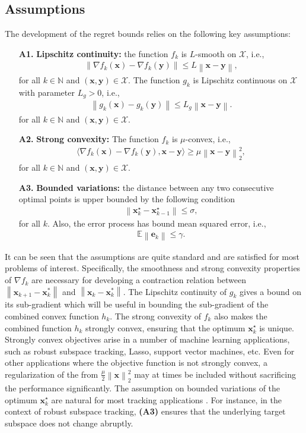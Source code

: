 \documentclass[draftcls,onecolumn,12pt]{IEEEtran}
\theoremstyle{plain}
\def\x{\mathbf{x}}
\def\e{\mathbf{e}}
\def\y{\mathbf{y}}
\def\cX {\mathcal{X}}
\def\N{\mathbb{N}}
\def\xks{\x_k^\star}
\def\EE{\mathbb{E}}
\providecommand{\norm}[1]{\left\|#1\right\|}
\providecommand{\ip}[1]{\langle#1\rangle}
\theoremstyle{plain}
\theoremstyle{remark}
\begin{document}
\subsection{Assumptions}
The development of the regret bounds relies on the following key assumptions: 
	  \begin{itemize}
	  	\item[\textbf{A1.}] \textbf{Lipschitz continuity:} the function $f_k$ is $L$-smooth on $\cX$, i.e., 
	  	\begin{align}\label{Lip_f1}
	  	\norm{\nabla f_k(\x) - \nabla f_k(\y)}\leq L\norm{\x-\y} , 
	  	\end{align}
	  	for all $k\in\N$ and $(\x,\y)\in\cX$. The function $g_k$ is Lipschitz continuous on $\cX$  with parameter $L_g>0$, i.e., 
        	\begin{align}\label{Lip_g1}
        \norm{ g_k(\x) -  g_k(\y)}\leq L_g\norm{\x-\y}.  
        \end{align}
        for all $k\in\N$ and $(\x,\y)\in\cX$. 
	  	\item[\textbf{A2.}] \textbf{Strong convexity:}  The function $f_k$ is $\mu$-convex, i.e.,
	  		  	\begin{align}\label{eq:SC}
	  	    \ip{\nabla f_k(\x) - \nabla f_k(\y),\x-\y} \geq \mu \norm{\x-\y}^2_2  , 
	  	\end{align}
for all $k\in\N$ and $(\x,\y)\in\cX$.			
	 \item[\textbf{A3.}] \textbf{Bounded variations:}  the distance between any two consecutive optimal points is upper bounded by the following condition 
	 \begin{align}\label{eq:BV}
	 \norm{\xks- \x_{k-1}^\star} \leq \sigma ,
	 \end{align}
	for all $k$. Also, the error process has bound mean squared error, i.e., 
	 \begin{align}\label{eq:BV2}
	 \EE\norm{\e_k} \leq \gamma. 
	 \end{align}
\end{itemize}  

It can be seen that the assumptions are quite standard and are satisfied for most problems of interest. Specifically, the smoothness and strong convexity properties of $\nabla f_k$ are necessary for developing a contraction relation between $\norm{\x_{k+1}-\x_k^*}$ and $\norm{\x_k-\x_k^*}$. The Lipschitz continuity of $g_k$ gives a bound on its sub-gradient which will be useful in bounding the sub-gradient of the combined convex function $h_k$. The strong convexity of $f_k$ also makes the combined function $h_k$ strongly convex, ensuring that the optimum $\xks$ is unique. Strongly convex objectives arise in a number of machine learning applications, such as robust subspace tracking, Lasso, support vector machines, etc. Even for other applications where the objective function is not strongly convex, a regularization of the from $\frac{\mu}{2}\norm{\x}^2_2$ may at times be included without sacrificing the performance significantly. The assumption on bounded variations of the optimum $\xks$ are natural for most tracking applications \cite{derenick2009convex,derenick2009optimal}. For instance, in the context of robust subspace tracking, \textbf{(A3)} ensures that the underlying target subspace does not change abruptly. 
\end{document}

